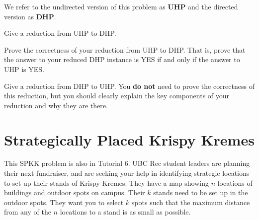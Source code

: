 \documentclass[11pt,fleqn]{exam}
\begin{document}
\begin{center}
\end{center}

We refer to the undirected version of this problem as \textbf{UHP} and the directed version as \textbf{DHP}.

\begin{questions}

    \question[3] Give a reduction from UHP to DHP.

    \question[4] Prove the correctness of your reduction from UHP to DHP. That is, prove that the answer to your reduced DHP instance is YES if and only if the answer to UHP is YES. 

    \question[7] Give a reduction from DHP to UHP. You \textbf{do not} need to prove the correctness of this reduction, but you should clearly explain the key components of your reduction and why they are there.

\end{questions}

\clearpage

\section{Strategically Placed Krispy Kremes}

This SPKK problem is also in Tutorial 6. UBC Rec student leaders are planning their next fundraiser, and are seeking your help in identifying strategic locations to set up their stands of Krispy Kremes. They have a map showing $n$ locations of buildings and outdoor spots on campus. Their $k$ stands need to be set up in the outdoor spots. They want you to select $k$ spots such that the maximum distance from any of the $n$ locations to a stand is as small as possible.
\end{document}
